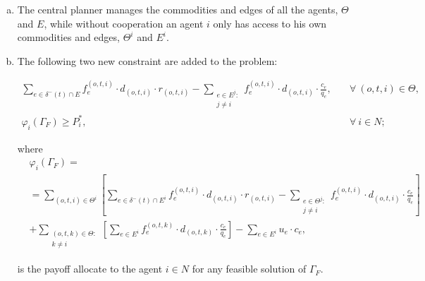 \documentclass[review]{elsarticle}
\begin{document}
\begin{enumerate}[(a)]
	\item The central planner manages the commodities and edges of
all the agents, $\Theta$ and $E$, while without cooperation an agent $i$ only has access to his own commodities and edges, $\Theta^i$ and $E^i$.
	\item The following two new constraint are added to the problem:

\begin{align}
\sum_{e \in \delta^-(t)\cap E}  f_e^{(o,t,i)} \cdot d_{(o,t,i)} \cdot r_{(o,t,i)} - \sum_{\substack{e \in E^j\colon \\ j\not = i}} f_e^{(o,t,i)} \cdot d_{(o,t,i)} \cdot \frac{c_e}{q_e}, \quad & \forall\ (o,t,i) \in \Theta, \label{eq:commodirevenue}\\
\varphi_i(\Gamma_F) \geq P_i^*,\quad & \forall\ i\in N; \label{eq:newconstraintFullCooperation}
\end{align}

where
\begin{equation}
    \begin{split}
    & \varphi_i(\Gamma_F) =\label{eq:FullCooperationPayoff} \\
    & = \sum_{(o,t,i)\in \Theta^i} \left[ \sum_{e \in \delta^-(t)\cap E^i} f_e^{(o,t,i)} \cdot d_{(o,t,i)} \cdot r_{(o,t,i)} -  \sum_{\substack{e\in \Theta^j \colon\\ j\not = i}} f_e^{(o,t,i)} \cdot d_{(o,t,i)} \cdot \frac{c_e}{q_e} \right]  \\
    & + \sum_{\substack{(o,t,k) \in \Theta  \colon \\ k \not = i}} \left[\sum_{e \in E^i} f_e^{(o,t,k)} \cdot d_{(o,t,k)} \cdot \frac{c_e}{q_e}\right] - \sum_{e \in E^i} u_e \cdot c_e, 
    \end{split}
\end{equation}

is the payoff allocate to the agent $i\in N$ for any feasible solution
of $\Gamma_F$.


\end{enumerate}
\end{document}
